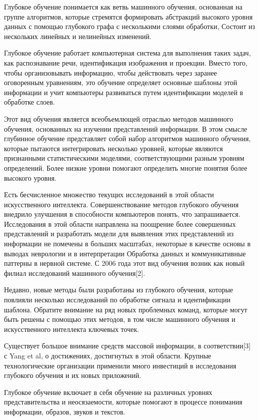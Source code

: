 Глубокое обучение понимается как ветвь машинного обучения, основанная на группе алгоритмов, которые стремятся формировать абстракций высокого уровня данных с помощью глубокого графа с несколькими слоями обработки, Состоит из нескольких линейных и нелинейных изменений.

Глубокое обучение работает компьютерная система для выполнения таких задач, как распознавание речи, идентификация изображения и проекции. Вместо того, чтобы организовывать информацию, чтобы действовать через заранее оговоренным уравнениям, это обучение определяет основные шаблоны этой информации и учит компьютеры развиваться путем идентификации моделей в обработке слоев.

Этот вид обучения является всеобъемлющей отраслью методов машинного обучения, основанных на изучении представлений информации. В этом смысле глубинное обучение представляет собой набор алгоритмов машинного обучения, которые пытаются интегрировать несколько уровней, которые являются признанными статистическими моделями, соответствующими разным уровням определений. Более низкие уровни помогают определить многие понятия более высокого уровня.

Есть бесчисленное множество текущих исследований в этой области искусственного интеллекта. Совершенствование методов глубокого обучения внедрило улучшения в способности компьютеров понять, что запрашивается. Исследования в этой области направлена на поощрение более совершенных представлений и разработать модели для выявления этих представлений из информации не помечены в больших масштабах, некоторые в качестве основы в выводах неврологии и в интерпретации Обработка данных и коммуникативные паттерны в нервной системе. С 2006 года этот вид обучения возник как новый филиал исследований машинного обучения[2].

Недавно, новые методы были разработаны из глубокого обучения, которые повлияли несколько исследований по обработке сигнала и идентификации шаблона. Обратите внимание на ряд новых проблемных команд, которые могут быть решены с помощью этих методов, в том числе машинного обучения и искусственного интеллекта ключевых точек.

Существует большое внимание средств массовой информации, в соответствии[3] с Yang et al, о достижениях, достигнутых в этой области. Крупные технологические организации применили много инвестиций в исследования глубокого обучения и их новых приложений.

Глубокое обучение включает в себя обучение на различных уровнях представительства и неосязаемости, которые помогают в процессе понимания информации, образов, звуков и текстов.

